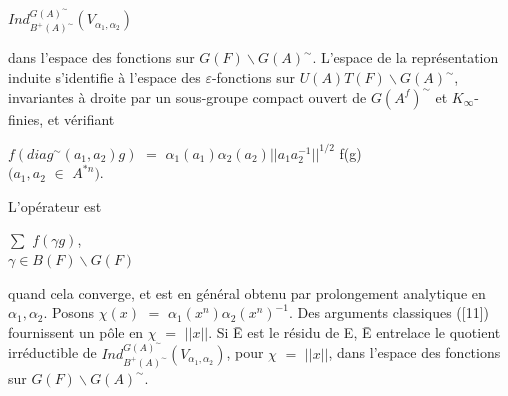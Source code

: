\documentclass[10pt,a4paper]{article}
\begin{document}
\clearpage
{}
\label{d035-physical-031}
\par\medskip{}\par\smallskip
\par\medskip{}\par\smallskip
\par\smallskip\begin{center}\begin{minipage}{0.96\textwidth}\centering
$Ind_{B^+(A)^\sim}^{G(A)^\sim}(V_{\alpha{}_1,\alpha{}_2})$
\end{minipage}\end{center}\smallskip
\par dans l'espace des fonctions sur $G(F)\backslash G(A)^\sim$. L'espace de la représentation induite s'identifie à l'espace des $\varepsilon{}$-fonctions sur $U(A)T(F)\backslash G(A)^\sim$, invariantes à droite par un sous-groupe compact ouvert de $G(A^f)^\sim$ et $K_\infty{}$-finies, et vérifiant\par
\par\smallskip\begin{center}\begin{minipage}{0.96\textwidth}\centering
$f(diag^\sim(a_1,a_2)g)$ $=$ $\alpha{}_1(a_1)\alpha{}_2(a_2)||a_1a_2^{-1}||^{1/2}$ f(g) \\ $(a_1,a_2$ $\in{}$ $A^{*n})$.
\end{minipage}\end{center}\smallskip
\par L'opérateur est\par
\par\smallskip\begin{center}\begin{minipage}{0.96\textwidth}\centering
$\sum{}$ $f(\gamma{}g)$, \\ $\gamma{}\in{}B(F)\backslash G(F)$
\end{minipage}\end{center}\smallskip
\par quand cela converge, et est en général obtenu par prolongement analytique en $\alpha{}_1,\alpha{}_2$. Posons $\chi{}(x)$ $=$ $\alpha{}_1(x^n)\alpha{}_2(x^n)^{-1}$. Des arguments classiques ([11]) fournissent un pôle en $\chi{}$ $=$ $||x||$. Si Ē est le résidu de E, Ē entrelace le quotient irréductible de $Ind_{B^+(A)^\sim}^{G(A)^\sim}(V_{\alpha{}_1,\alpha{}_2})$, pour $\chi{}$ $=$ $||x||$, dans l'espace des fonctions sur $G(F)\backslash G(A)^\sim$.\par
\end{document}
